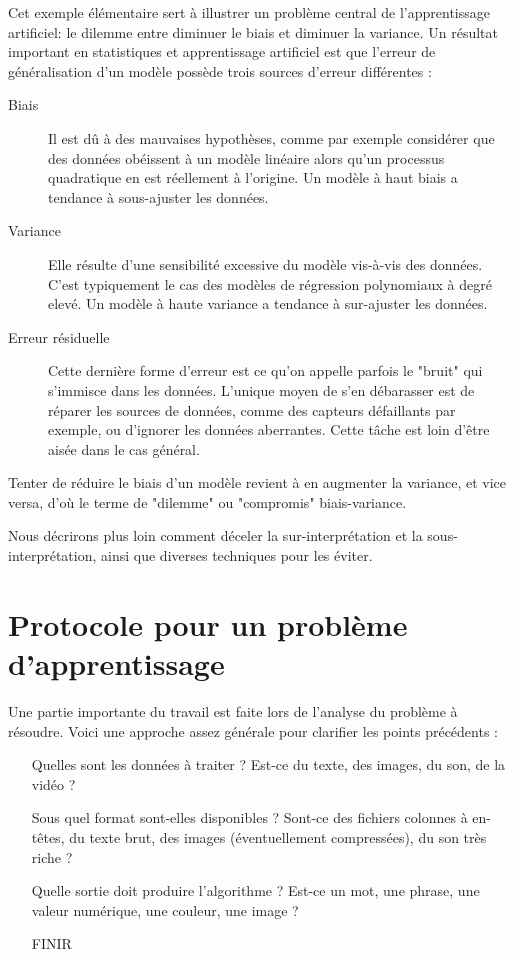 Cet exemple élémentaire sert à illustrer un problème central de l'apprentissage artificiel: le dilemme entre diminuer le biais et diminuer la variance. Un résultat important en statistiques et apprentissage artificiel est que l'erreur de généralisation d'un modèle  possède trois sources d'erreur différentes : 
\begin{description}
\item [Biais] Il est dû à des mauvaises hypothèses, comme par exemple considérer que des données obéissent à un modèle linéaire alors qu'un processus quadratique en est réellement à l'origine. Un modèle à haut biais a tendance à sous-ajuster les données.
\item [Variance] Elle résulte d'une sensibilité excessive du modèle vis-à-vis des données. C'est typiquement le cas des modèles de régression polynomiaux à degré elevé. Un modèle à haute variance a tendance à sur-ajuster les données.
\item[Erreur résiduelle] Cette dernière forme d'erreur est ce qu'on appelle parfois le "bruit" qui s'immisce dans les données. L'unique moyen de s'en débarasser est de réparer les sources de données, comme des capteurs défaillants par exemple, ou d'ignorer les données aberrantes. Cette tâche est loin d'être aisée dans le cas général.
\end{description}

Tenter de réduire le biais d'un modèle revient à en augmenter la variance, et vice versa, d'où le terme de "dilemme" ou "compromis" biais-variance.

Nous décrirons plus loin comment déceler la sur-interprétation et la sous-interprétation, ainsi que diverses techniques pour les éviter.

\section{Protocole pour un problème d'apprentissage}
Une partie importante du travail est faite lors de l'analyse du problème à résoudre. Voici une approche assez générale pour clarifier les points précédents :

\begin{itemize}
\item[Quelles sont les données à traiter ?] Est-ce du texte, des images, du son, de la vidéo ?
\item[Sous quel format sont-elles disponibles ?] Sont-ce des fichiers colonnes à en-têtes, du texte brut, des images (éventuellement compressées), du son très riche ?
\item[Quelle sortie doit produire l'algorithme ?] Est-ce un mot, une phrase, une valeur numérique, une couleur, une image ?
\item [FINIR]
\end{itemize}

